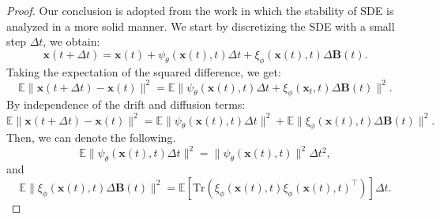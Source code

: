 \documentclass{article} %
\begin{document}
\begin{proof}
Our conclusion is adopted from the work \cite{khasminskii2012stochastic} in which the stability of SDE is analyzed in a more solid manner. We start by discretizing the SDE with a small step \( \Delta t \), we obtain:
\begin{equation}
    \mathbf{x}(t+\Delta t) = \mathbf{x}(t) + \psi_{\theta}(\mathbf{x}(t), t) \Delta t + \xi_{\phi}(\mathbf{x}(t), t) \Delta \mathbf{B}(t).
\end{equation}
Taking the expectation of the squared difference, we get:
\begin{equation}
    \mathbb{E} \|\mathbf{x}(t+\Delta t) - \mathbf{x}(t)\|^2 = \mathbb{E} \|\psi_{\theta}(\mathbf{x}(t), t) \Delta t + \xi_{\phi}(\mathbf{x}_t, t) \Delta \mathbf{B}(t)\|^2.
\end{equation}
By independence of the drift and diffusion terms:
\begin{equation}
     \mathbb{E} \|\mathbf{x}({t+\Delta t}) - \mathbf{x}(t)\|^2= \mathbb{E} \|\psi_{\theta}(\mathbf{x}(t), t) \Delta t\|^2 + \mathbb{E} \|\xi_{\phi}(\mathbf{x}(t), t) \Delta \mathbf{B}(t)\|^2.
\end{equation}
Then, we can denote the following.
\begin{equation}
    \mathbb{E} \|\psi_{\theta}(\mathbf{x}(t), t) \Delta t\|^2 = \|\psi_{\theta}(\mathbf{x}(t), t)\|^2 \Delta t^2, \tag{Drift term contribution} 
\end{equation}
and 
\begin{equation}
    \mathbb{E} \|\xi_{\phi}(\mathbf{x}(t), t) \Delta \mathbf{B}(t)\|^2 = \mathbb{E} \left[ \text{Tr}(\xi_{\phi}(\mathbf{x}(t), t) \xi_{\phi}(\mathbf{x}(t), t)^\top) \right] \Delta t. \tag{Diffusion term contribution} 
\end{equation}


\end{proof}
\end{document}
